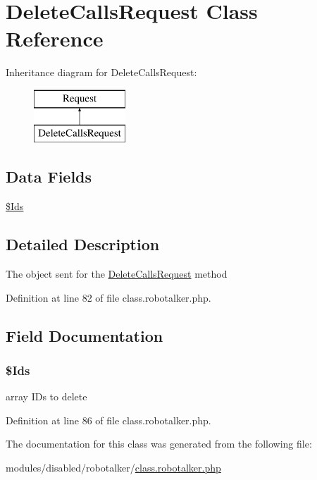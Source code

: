 \hypertarget{class_delete_calls_request}{\section{Delete\-Calls\-Request Class Reference}
\label{class_delete_calls_request}
}
Inheritance diagram for Delete\-Calls\-Request\-:\begin{figure}[H]
\begin{center}
\leavevmode
\includegraphics[height=2.000000cm]{class_delete_calls_request}
\end{center}
\end{figure}
\subsection*{Data Fields}
\begin{DoxyCompactItemize}
\item 
\hyperlink{class_delete_calls_request_a003384fac9231dcb79d5719b16e9eed8}{\$\-Ids}
\end{DoxyCompactItemize}


\subsection{Detailed Description}
The object sent for the \hyperlink{class_delete_calls_request}{Delete\-Calls\-Request} method 

Definition at line 82 of file class.\-robotalker.\-php.



\subsection{Field Documentation}
\hypertarget{class_delete_calls_request_a003384fac9231dcb79d5719b16e9eed8}{
\subsubsection[{\$\-Ids}]{\setlength{\rightskip}{0pt plus 5cm}\$Ids}}\label{class_delete_calls_request_a003384fac9231dcb79d5719b16e9eed8}
array I\-Ds to delete 

Definition at line 86 of file class.\-robotalker.\-php.



The documentation for this class was generated from the following file\-:\begin{DoxyCompactItemize}
\item 
modules/disabled/robotalker/\hyperlink{class_8robotalker_8php}{class.\-robotalker.\-php}\end{DoxyCompactItemize}

